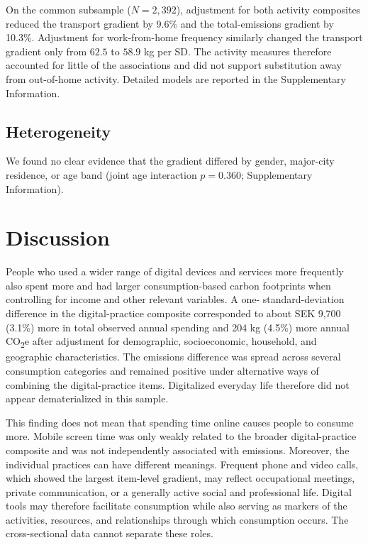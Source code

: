 \documentclass[11pt,a4paper]{article}
\begin{document}
On the common subsample ($N=2,392$), adjustment for both activity composites
reduced the transport gradient by 9.6\% and the total-emissions gradient by
10.3\%. Adjustment for work-from-home frequency similarly changed the transport
gradient only from $62.5$ to $58.9$ kg per SD. The activity measures therefore
accounted for little of the associations and did not support substitution away
from out-of-home activity. Detailed models are reported in the Supplementary
Information.

\subsection{Heterogeneity}
We found no clear evidence that the gradient differed by gender, major-city
residence, or age band (joint age interaction $p=0.360$; Supplementary
Information).

\section{Discussion}

People who used a wider range of digital devices and services more frequently
also spent more and had larger consumption-based carbon footprints when controlling for income and other relevant variables. A one-
standard-deviation difference in the digital-practice composite corresponded to
about SEK 9,700 (3.1\%) more in total observed annual spending and 204 kg
(4.5\%) more annual CO\textsubscript{2}e after adjustment for demographic,
socioeconomic, household, and geographic characteristics.
The emissions difference was spread across
several consumption categories and remained positive under alternative ways of
combining the digital-practice items. Digitalized everyday life therefore did
not appear dematerialized in this sample.

This finding does not mean that spending time online causes people to consume
more. Mobile screen time was only weakly related to the broader digital-practice
composite and was not independently associated with emissions. Moreover, the
individual practices can have different meanings. Frequent phone and video
calls, which showed the largest item-level gradient, may reflect occupational
meetings, private communication, or a generally active social and professional
life. Digital tools may therefore facilitate consumption while also serving as
markers of the activities, resources, and relationships through which
consumption occurs. The cross-sectional data cannot separate these roles.
\end{document}
